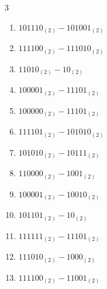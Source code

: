\begin{multicols}{3}
\begin{enumerate}
  \item $101110_{(2)} - 101001_{(2)}$


\columnbreak %

  \item $111100_{(2)} - 111010_{(2)}$


  \item $11010_{(2)} - 10_{(2)}$


  \item $100001_{(2)} - 11101_{(2)}$


  \item $100000_{(2)} - 11101_{(2)}$


  \item $111101_{(2)} - 101010_{(2)}$


  \item $101010_{(2)} - 10111_{(2)}$


  \item $110000_{(2)} - 1001_{(2)}$


  \item $100001_{(2)} - 10010_{(2)}$


  \item $101101_{(2)} - 10_{(2)}$


  \item $111111_{(2)} - 11101_{(2)}$


\columnbreak %

\resetques

  \item $111010_{(2)} - 1000_{(2)}$


  \item $111100_{(2)} - 11001_{(2)}$



\end{enumerate}
\end{multicols}

